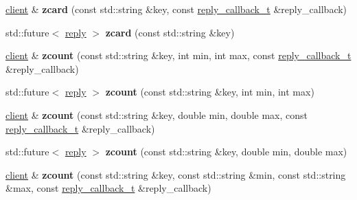 \begin{DoxyCompactItemize}
\mbox{\label{classcpp__redis_1_1client_a54259186a650211cc8b5fb70af1384ba}} 
\hyperlink{classcpp__redis_1_1client}{client} \& {\bfseries zcard} (const std\+::string \&key, const \hyperlink{classcpp__redis_1_1client_a061a1140d36d2eaeda82b09a0bb3f9f2}{reply\+\_\+callback\+\_\+t} \&reply\+\_\+callback)
\item 
\mbox{\label{classcpp__redis_1_1client_a9cfeae7394f3fa2b3ff7ec1f1c56ca1b}} 
std\+::future$<$ \hyperlink{classcpp__redis_1_1reply}{reply} $>$ {\bfseries zcard} (const std\+::string \&key)
\item 
\mbox{\label{classcpp__redis_1_1client_a405463c110eb39e66163f0d936e42815}} 
\hyperlink{classcpp__redis_1_1client}{client} \& {\bfseries zcount} (const std\+::string \&key, int min, int max, const \hyperlink{classcpp__redis_1_1client_a061a1140d36d2eaeda82b09a0bb3f9f2}{reply\+\_\+callback\+\_\+t} \&reply\+\_\+callback)
\item 
\mbox{\label{classcpp__redis_1_1client_a7965bc6ab1198ca3bb5b31c10da95c34}} 
std\+::future$<$ \hyperlink{classcpp__redis_1_1reply}{reply} $>$ {\bfseries zcount} (const std\+::string \&key, int min, int max)
\item 
\mbox{\label{classcpp__redis_1_1client_a648afc3a38da6413e6b735d2708c3fe3}} 
\hyperlink{classcpp__redis_1_1client}{client} \& {\bfseries zcount} (const std\+::string \&key, double min, double max, const \hyperlink{classcpp__redis_1_1client_a061a1140d36d2eaeda82b09a0bb3f9f2}{reply\+\_\+callback\+\_\+t} \&reply\+\_\+callback)
\item 
\mbox{\label{classcpp__redis_1_1client_a7d3ddea81b718564c060a51575d8c127}} 
std\+::future$<$ \hyperlink{classcpp__redis_1_1reply}{reply} $>$ {\bfseries zcount} (const std\+::string \&key, double min, double max)
\item 
\mbox{\label{classcpp__redis_1_1client_a4638b70036c17ddd87dc204392ea7718}} 
\hyperlink{classcpp__redis_1_1client}{client} \& {\bfseries zcount} (const std\+::string \&key, const std\+::string \&min, const std\+::string \&max, const \hyperlink{classcpp__redis_1_1client_a061a1140d36d2eaeda82b09a0bb3f9f2}{reply\+\_\+callback\+\_\+t} \&reply\+\_\+callback)

\end{DoxyCompactItemize}
